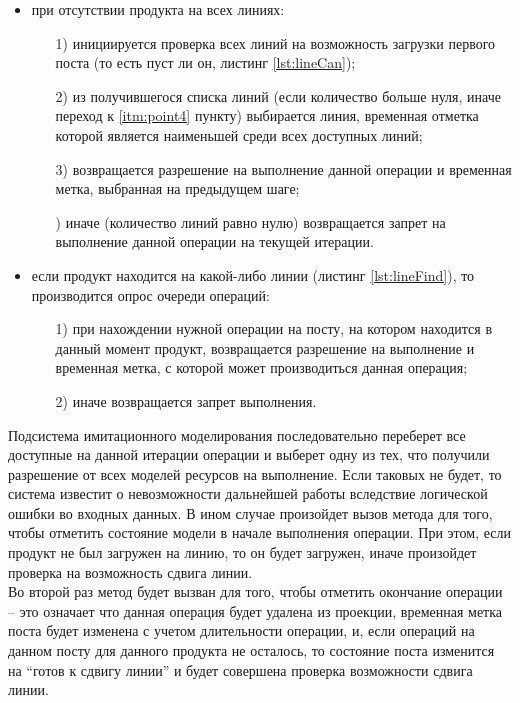 \begin{itemize}
	\item при отсутствии продукта на всех линиях:
		\begin{enumerate}
			\item[1)] инициируется проверка всех линий на возможность загрузки первого поста (то есть пуст ли он, листинг \ref{lst:lineCan});
			\item[2)] из получившегося списка линий (если количество больше нуля, иначе переход к \ref{itm:point4} пункту) выбирается линия, временная отметка которой является наименьшей среди всех доступных линий;
			\item[3)] возвращается разрешение на выполнение данной операции и временная метка, выбранная на предыдущем шаге;
			\item[\mylabel{itm:point4}{4})] иначе (количество линий равно нулю) возвращается запрет на выполнение данной операции на текущей итерации.
		\end{enumerate}
	\item если продукт находится на какой-либо линии (листинг \ref{lst:lineFind}), то производится опрос очереди операций:
		\begin{enumerate}
			\item[1)] при нахождении нужной операции на посту, на котором находится в данный момент продукт, возвращается разрешение на выполнение и временная метка, с которой может производиться данная операция;
			\item[2)] иначе возвращается запрет выполнения.
		\end{enumerate}
\end{itemize}

\indent Подсистема имитационного моделирования последовательно переберет все доступные на данной итерации операции и выберет одну из тех, что получили разрешение от всех моделей ресурсов на выполнение.
Если таковых не будет, то система известит о невозможности дальнейшей работы вследствие логической ошибки во входных данных.
В ином случае произойдет вызов метода для того, чтобы отметить состояние модели в начале выполнения операции.
При этом, если продукт не был загружен на линию, то он будет загружен, иначе произойдет проверка на возможность сдвига линии.\\
\indent Во второй раз метод будет вызван для того, чтобы отметить окончание операции -- это означает что данная операция будет удалена из проекции, временная метка поста будет изменена с учетом длительности операции, и, если операций на данном посту для данного продукта не осталось, то состояние поста изменится на ``готов к сдвигу линии'' и будет совершена проверка возможности сдвига линии.

